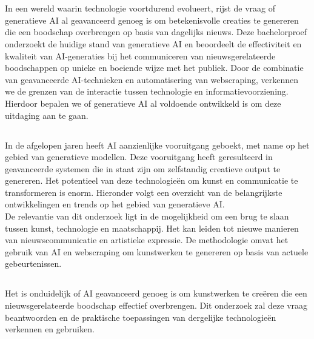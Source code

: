 
\chapter{}%
\label{ch:inleiding}

\noindent
In een wereld waarin technologie voortdurend evolueert, rijst de vraag of generatieve AI al geavanceerd genoeg is om betekenisvolle creaties te genereren die een boodschap overbrengen op basis van dagelijks nieuws. Deze bachelorproef onderzoekt de huidige stand van generatieve AI en beoordeelt de effectiviteit en kwaliteit van AI-generaties bij het communiceren van nieuwsgerelateerde boodschappen op unieke en boeiende wijze met het publiek. Door de combinatie van geavanceerde AI-technieken en automatisering van webscraping, verkennen we de grenzen van de interactie tussen technologie en informatievoorziening. Hierdoor bepalen we of generatieve AI al voldoende ontwikkeld is om deze uitdaging aan te gaan.
\pagebreak


\section{}%
\label{sec:context}
\noindent
In de afgelopen jaren heeft AI aanzienlijke vooruitgang geboekt, met name op het gebied van generatieve modellen. Deze vooruitgang heeft geresulteerd in geavanceerde systemen die in staat zijn om zelfstandig creatieve output te genereren. Het potentieel van deze technologieën om kunst en communicatie te transformeren is enorm. Hieronder volgt een overzicht van de belangrijkste ontwikkelingen en trends op het gebied van generatieve AI. \\

\noindent
De relevantie van dit onderzoek ligt in de mogelijkheid om een brug te slaan tussen kunst, technologie en maatschappij. Het kan leiden tot nieuwe manieren van nieuwscommunicatie en artistieke expressie. De methodologie omvat het gebruik van AI en webscraping om kunstwerken te genereren op basis van actuele gebeurtenissen.


\section{}%
\label{sec:probleemstelling}
\noindent
Het is onduidelijk of AI geavanceerd genoeg is om kunstwerken te creëren die een nieuwsgerelateerde boodschap effectief overbrengen. Dit onderzoek zal deze vraag beantwoorden en de praktische toepassingen van dergelijke technologieën verkennen en gebruiken.

